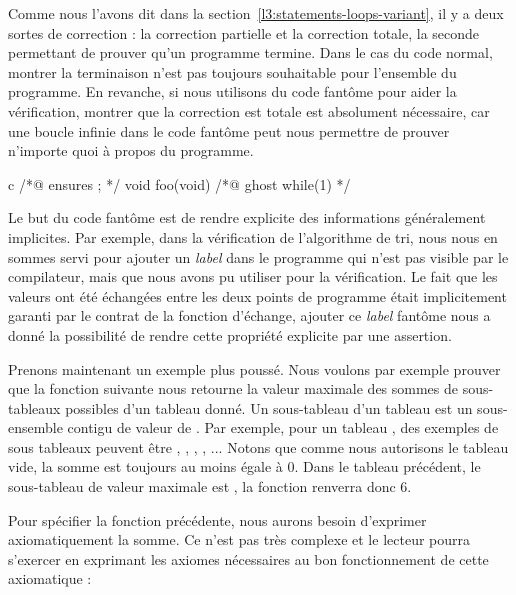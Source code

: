 Comme nous l'avons dit dans la section~\ref{l3:statements-loops-variant}, il y
a deux sortes de correction : la correction partielle et la correction totale,
la seconde permettant de prouver qu'un programme termine. Dans le cas du code
normal, montrer la terminaison n'est pas toujours souhaitable pour l'ensemble
du programme. En revanche, si nous utilisons du code fantôme pour aider la
vérification, montrer que la correction est totale est absolument nécessaire,
car une boucle infinie dans le code fantôme peut nous permettre de prouver
n'importe quoi à propos du programme.


\begin{CodeBlock}{c}
/*@ ensures \false ; */
void foo(void){
  /*@ ghost
    while(1){}
  */
}
\end{CodeBlock}




Le but du code fantôme est de rendre explicite des informations généralement
implicites. Par exemple, dans la vérification de l'algorithme de tri, nous nous en
sommes servi pour ajouter un \textit{label} dans le programme qui n'est pas
visible par le compilateur, mais que nous avons pu utiliser pour la vérification.
Le fait que les valeurs ont été échangées entre les deux points de programme était
implicitement garanti par le contrat de la fonction d'échange, ajouter ce
\textit{label} fantôme nous a donné la possibilité de rendre cette propriété
explicite par une assertion.



Prenons maintenant un exemple plus poussé. Nous voulons par exemple prouver que
la fonction suivante nous retourne la valeur maximale des sommes de sous-tableaux
possibles d'un tableau donné. Un sous-tableau d'un tableau  est un
sous-ensemble contigu de valeur de . Par exemple, pour un tableau
, des exemples de sous tableaux peuvent être
\CodeInline{\{\}}, , ,
, ... Notons que comme nous autorisons le
tableau vide, la somme est toujours au moins égale à 0. Dans le tableau précédent,
le sous-tableau de valeur maximale est , la fonction
renverra donc 6.






Pour spécifier la fonction précédente, nous aurons besoin d'exprimer
axiomatiquement la somme. Ce n'est pas très complexe et le lecteur pourra
s'exercer en exprimant les axiomes nécessaires au bon fonctionnement de cette
axiomatique :



